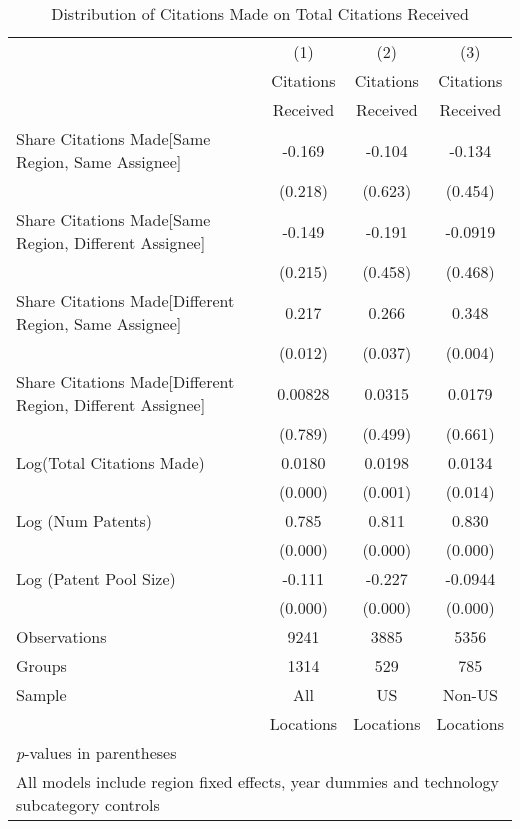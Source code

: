 {
\def\sym#1{\ifmmode^{#1}\else\(^{#1}\)\fi}
\begin{longtable}{l*{3}{c}}
\caption{Distribution of Citations Made on Total Citations Received \label{model123}}\\
\hline\hline\endfirsthead\hline\endhead\hline\endfoot\endlastfoot
                &\multicolumn{1}{c}{(1)}&\multicolumn{1}{c}{(2)}&\multicolumn{1}{c}{(3)}\\
                &\multicolumn{1}{c}{Citations}&\multicolumn{1}{c}{Citations}&\multicolumn{1}{c}{Citations}\\
                 &\multicolumn{1}{c}{Received}&\multicolumn{1}{c}{Received}&\multicolumn{1}{c}{Received}\\
\hline
Share Citations Made[Same Region, Same Assignee]&   -0.169         &   -0.104         &   -0.134         \\
                &  (0.218)         &  (0.623)         &  (0.454)         \\
Share Citations Made[Same Region, Different Assignee]&   -0.149         &   -0.191         &  -0.0919         \\
                &  (0.215)         &  (0.458)         &  (0.468)         \\
Share Citations Made[Different Region, Same Assignee]&    0.217  &    0.266  &    0.348 \\
                &  (0.012)         &  (0.037)         &  (0.004)         \\
Share Citations Made[Different Region, Different Assignee]&  0.00828         &   0.0315         &   0.0179         \\
                &  (0.789)         &  (0.499)         &  (0.661)         \\
Log(Total Citations Made)&   0.0180&   0.0198&   0.0134  \\
                &  (0.000)         &  (0.001)         &  (0.014)         \\
Log (Num Patents)&    0.785&    0.811&    0.830\\
                &  (0.000)         &  (0.000)         &  (0.000)         \\
Log (Patent Pool Size)&   -0.111&   -0.227&  -0.0944\\
                &  (0.000)         &  (0.000)         &  (0.000)         \\
\hline
Observations&9241&3885&5356         \\
Groups&1314&529&785\\
Sample&All &US &Non-US \\
          &Locations &Locations&Locations \\
\hline\hline
\multicolumn{4}{l}{\footnotesize \textit{p}-values in parentheses}\\
\multicolumn{4}{l}{\footnotesize All models include region fixed effects, year dummies and technology subcategory controls}\\
\end{longtable}
}
